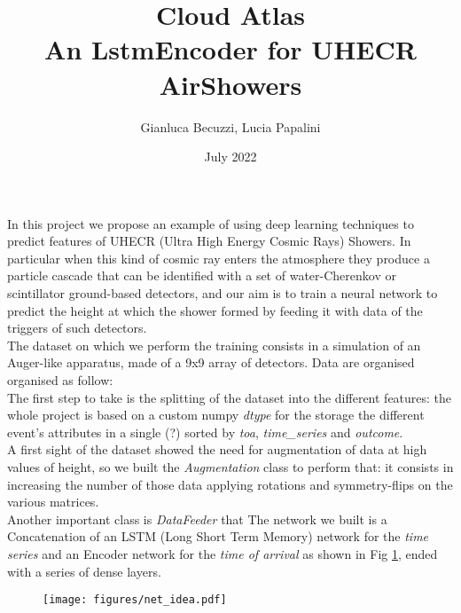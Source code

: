 \documentclass{article}
\title{Cloud Atlas \\[1ex] \large An LstmEncoder for UHECR AirShowers}
\author{Gianluca Becuzzi, Lucia Papalini}
\date{July 2022}
\begin{document}
\maketitle

In this project we propose an example of using deep learning techniques to predict features of UHECR 
(Ultra High Energy Cosmic Rays) Showers.
In particular when this kind of cosmic ray enters the atmosphere they produce a particle cascade 
that can be identified with a set of water-Cherenkov or scintillator ground-based detectors, and our aim
 is to train a neural network to predict the height at which the shower formed by feeding it with data 
 of the triggers of such detectors.\\
The dataset on which we perform the training consists in a simulation of an Auger-like apparatus, 
made of a 9x9 array of detectors.  Data are organised organised as follow:
\\
The first step to take is the splitting of the dataset into the different features:
 the whole project is based on a custom numpy \textit{dtype} for the storage the different event's attributes
  in a single (?) sorted by \textit{toa}, \textit{time\_series} and \textit{outcome}.\\
A first sight of the dataset showed the need for augmentation of data at high values of height,
 so we built the \textit{Augmentation} class to perform that: it consists in increasing the 
 number of those data applying rotations and symmetry-flips on the various matrices.\\
Another important class is \textit{DataFeeder} that 
The network we built is a Concatenation of an LSTM (Long Short Term Memory) network 
for the \textit{time series} and an Encoder network for the \textit{time of arrival} as 
shown in Fig \ref{fig:network}, ended with a series of dense layers.
\begin{figure}
    \centering
    \texttt{[image: figures/net\_idea.pdf]}
    \label{fig:network}
\end{figure}
\end{document}
